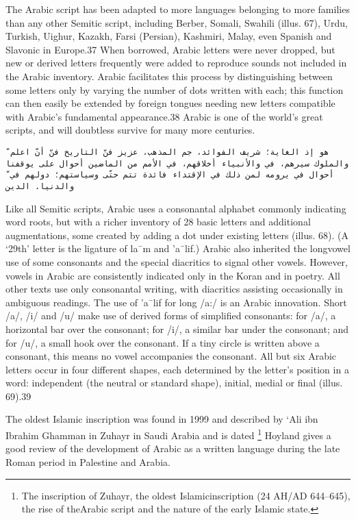 The Arabic script has
been adapted to more languages belonging to more families
than any other Semitic script, including Berber, Somali, Swahili
(illus. 67), Urdu, Turkish, Uighur, Kazakh, Farsi (Persian),
Kashmiri, Malay, even Spanish and Slavonic in Europe.37 When
borrowed, Arabic letters were never dropped, but new or
derived letters frequently were added to reproduce sounds not
included in the Arabic inventory. Arabic facilitates this process
by distinguishing between some letters only by varying the
number of dots written with each; this function can then easily
be extended by foreign tongues needing new letters compatible
with Arabic’s fundamental appearance.38 Arabic is one of the
world’s great scripts, and will doubtless survive for many more
centuries.


\begin{Arabic}
\begin{verbatim}
ّ هو إذ الغاية؛ شريف الفوائد، جم المذهب، عزيز فنّ التاريخ فنّ أنّ اعلم
والملوك سيرهم، في والأنبياء أخلاقهم، في الأمم من الماضين أحوال على يوقفنا
ّ أحوال في يرومه لمن ذلك في الإقتداء فائدة تتم حتّى وسياستهم؛ دولهم في
والدنيا. الدين

\end{verbatim}
\end{Arabic}

Like all Semitic scripts, Arabic uses a consonantal alphabet
commonly indicating word roots, but with a richer inventory of
28 basic letters and additional augmentations, some created by
adding a dot under existing letters (illus. 68). (A ‘29th’ letter is
the ligature of la¯m and ’a¯lif.) Arabic also inherited the longvowel
use of some consonants and the special diacritics to signal
other vowels. However, vowels in Arabic are consistently indicated
only in the Koran and in poetry. All other texts use only
consonantal writing, with diacritics assisting occasionally in
ambiguous readings. The use of ’a¯lif for long /a:/ is an Arabic
innovation. Short /a/, /i/ and /u/ make use of derived forms of
simplified consonants: for /a/, a horizontal bar over the consonant;
for /i/, a similar bar under the consonant; and for /u/, a
small hook over the consonant. If a tiny circle is written above a
consonant, this means no vowel accompanies the consonant. All
but six Arabic letters occur in four different shapes, each determined
by the letter’s position in a word: independent (the neutral
or standard shape), initial, medial or final (illus. 69).39

The oldest Islamic inscription was found in 1999 and described by ‘{}Ali ibn Ibrahim Ghamman in Zuhayr in 
Saudi Arabia and is dated \footnote{ 
The inscription of Zuhayr, the oldest Islamicinscription (24 AH/AD 644–645), the rise of theArabic script and the nature of the early Islamic state.} Hoyland\cite{hoyland2010} gives a good review of the development of Arabic as
a written language during the late Roman period in Palestine and Arabia. 




